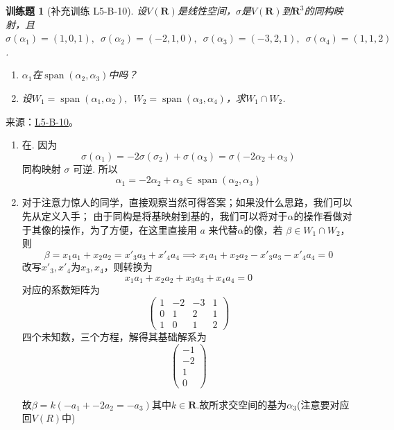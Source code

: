 \documentclass[12pt,fontset=fandol]{ctexart}
\newtheorem{exercise}{训练题}[section]
\begin{document}
\begin{exercise}[补充训练 L5-B-10]\label{prob:L5-B-10}
设$V(\mathbf{R})$是线性空间，$\sigma$是$V(\mathbf{R})$到$\mathbf{R}^3$的同构映射，且$\sigma(\alpha_1)=(1,0,1),\enspace\allowbreak\sigma(\alpha_2)=(-2,1,0),\enspace\allowbreak\sigma(\alpha_3)=(-3,2,1),\enspace\allowbreak\sigma(\alpha_4)=(1,1,2)$.
        \begin{enumerate}
            \item $\alpha_1$在$\operatorname{span}(\alpha_2,\alpha_3)$中吗？

            \item 设$W_1=\operatorname{span}(\alpha_1,\alpha_2),\enspace W_2=\operatorname{span}(\alpha_3,\alpha_4)$，求$W_1\cap W_2$.
        \end{enumerate}
\end{exercise}
\noindent 来源：\href{https://github.com/yhwu-is/Linear-Algebra-Left-Undone/blob/new/%E8%AE%B2%E4%B9%89/%E4%B8%93%E9%A2%98/5%20%E7%BA%BF%E6%80%A7%E6%98%A0%E5%B0%84.tex}{L5-B-10}。
\begin{solve}
\begin{enumerate}
                \item 在. 因为
                      \[ \sigma(\alpha_1) = -2 \sigma(\sigma_2) + \sigma(\alpha_3) = \sigma(-2 \alpha_2 + \alpha_3) \]
                      同构映射 $ \sigma $ 可逆. 所以
                      \[ \alpha_1 = -2 \alpha_2 + \alpha_3 \in \operatorname{span}(\alpha_2, \alpha_3) \]
                \item 对于注意力惊人的同学，直接观察当然可得答案；如果没什么思路，我们可以先从定义入手；
                由于同构是将基映射到基的，我们可以将对于$\alpha$的操作看做对于其像的操作，为了方便，在这里直接用 $a$ 来代替$\alpha$的像，若 $\beta \in W_1\cap W_2$，则
                \[ \beta = x_1 a_1+x_2 a_2=x'_3 a_3+x'_4 a_4 \implies  x_1 a_1+x_2 a_2-x'_3 a_3-x'_4 a_4 = 0 \]
                改写$x'_3,x'_4$为$x_3,x_4$，则转换为
                \[ x_1 a_1+x_2 a_2+x_3 a_3+x_4 a_4 = 0 \]
                对应的系数矩阵为
                \[ \begin{pmatrix}
                    1 & -2 & -3 & 1 \\
                    0 & 1 & 2 & 1\\
                    1 & 0 & 1 & 2
                \end{pmatrix} \]
                四个未知数，三个方程，解得其基础解系为
                \[ \begin{pmatrix}
                    -1 \\
                    -2 \\
                    1 \\
                    0
                \end{pmatrix} \]

                故$\beta = k(-a_1+-2a_2=-a_3)$其中$k\in \mathbf{R}$.故所求交空间的基为$\alpha_3$(注意要对应回$V(R)$中)
            \end{enumerate}
\end{solve}
\end{document}
